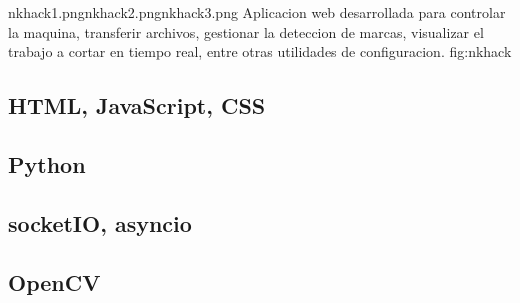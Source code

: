             {nkhack1.png}{nkhack2.png}{nkhack3.png}
            {Aplicacion web desarrollada para controlar la maquina, transferir archivos, gestionar la deteccion de marcas, visualizar el trabajo a cortar en tiempo real, entre otras utilidades de configuracion.}
            {fig:nkhack}

\subsection{HTML, JavaScript, CSS}
\subsection{Python}
\subsection{socketIO, asyncio}
\subsection{OpenCV}

